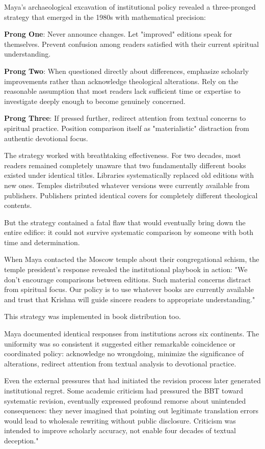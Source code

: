 \documentclass[12pt,twoside]{book}
\begin{document}
Maya's archaeological excavation of institutional policy revealed a three-pronged strategy that emerged in the 1980s with mathematical precision:

\textbf{\textbf{Prong One}}: Never announce changes. Let "improved" editions speak for themselves. Prevent confusion among readers satisfied with their current spiritual understanding.

\textbf{\textbf{Prong Two}}: When questioned directly about differences, emphasize scholarly improvements rather than acknowledge theological alterations. Rely on the reasonable assumption that most readers lack sufficient time or expertise to investigate deeply enough to become genuinely concerned.

\textbf{\textbf{Prong Three}}: If pressed further, redirect attention from textual concerns to spiritual practice. Position comparison itself as "materialistic" distraction from authentic devotional focus.

The strategy worked with breathtaking effectiveness. For two decades, most readers remained completely unaware that two fundamentally different books existed under identical titles. Libraries systematically replaced old editions with new ones. Temples distributed whatever versions were currently available from publishers. Publishers printed identical covers for completely different theological contents.

But the strategy contained a fatal flaw that would eventually bring down the entire edifice: it could not survive systematic comparison by someone with both time and determination.

When Maya contacted the Moscow temple about their congregational schism, the temple president's response revealed the institutional playbook in action: "We don't encourage comparisons between editions. Such material concerns distract from spiritual focus. Our policy is to use whatever books are currently available and trust that Krishna will guide sincere readers to appropriate understanding."

This strategy was implemented in book distribution too.

Maya documented identical responses from institutions across six continents. The uniformity was so consistent it suggested either remarkable coincidence or coordinated policy: acknowledge no wrongdoing, minimize the significance of alterations, redirect attention from textual analysis to devotional practice.

Even the external pressures that had initiated the revision process later generated institutional regret. Some academic criticism had pressured the BBT toward systematic revision, eventually expressed profound remorse about unintended consequences: they never imagined that pointing out legitimate translation errors would lead to wholesale rewriting without public disclosure. Criticism was intended to improve scholarly accuracy, not enable four decades of textual deception."
\end{document}
